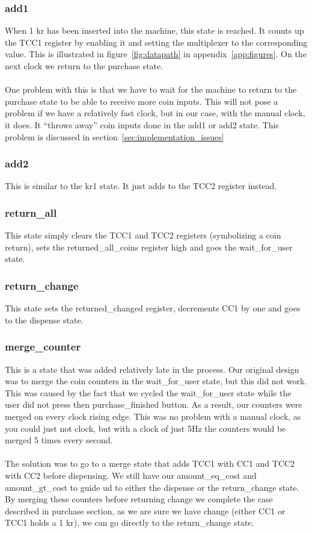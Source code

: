 \subsubsection{add1}
When 1 kr has been inserted into the machine, this state is reached. It counts up the TCC1 register by enabling it and setting the multiplexer to the corresponding value. This is illustrated in figure~\ref{fig:datapath} in appendix~\ref{app:figures}. On the next clock we return to the purchase state.\\
\\
One problem with this is that we have to wait for the machine to return to the purchase state to be able to receive more coin inputs. This will not pose a problem if we have a relatively fast clock, but in our case, with the manual clock, it does. It ``throws away'' coin inputs done in the add1 or add2 state. This problem is discussed in section~\ref{sec:implementation_issues}

\subsubsection{add2}
This is similar to the kr1 state. It just adds to the TCC2 register instead.

\subsubsection{return\_all}
This state simply clears the TCC1 and TCC2 registers (symbolizing a coin return), sets the returned\_all\_coins register high and goes the wait\_for\_user state.


\subsubsection{return\_change}
This state sets the returned\_changed register, decrements CC1 by one and goes to the dispense state.

\subsubsection{merge\_counter}
This is a state that was added relatively late in the process. Our original design was to merge the coin counters in the wait\_for\_user state, but this did not work. This was caused by the fact that we cycled the wait\_for\_user state while the user did not press then purchase\_finished button. As a result, our counters were merged on every clock rising edge. This was no problem with a manual clock, as you could just not clock, but with a clock of just 5Hz the counters would be merged 5 times every second.\\
\\
The solution was to go to a merge state that adds TCC1 with CC1 and TCC2 with CC2 before dispensing. We still have our amount\_eq\_cost and amount\_gt\_cost to guide ud to either the dispense or  the return\_change state.\\
By merging these counters before returning change we complete the case described in purchase section, as we are sure we have change (either CC1 or TCC1 holds a 1 kr), we can go directly to the return\_change state.




